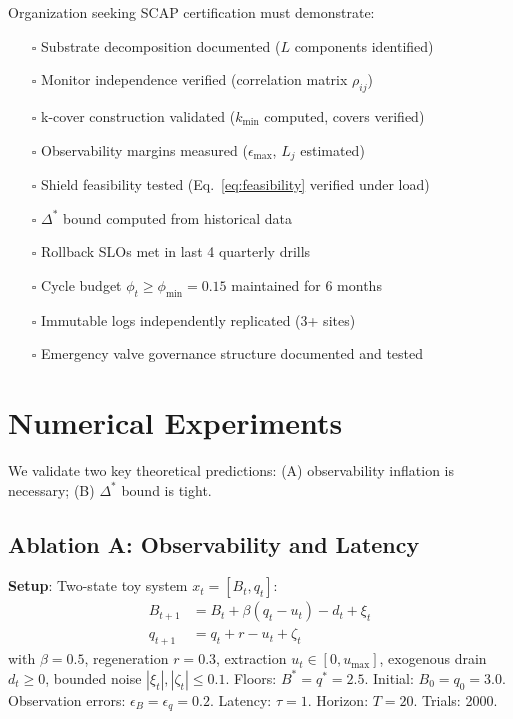 \documentclass[11pt,a4paper]{article}
\begin{document}
Organization seeking SCAP certification must demonstrate:
\begin{itemize}
\item[$\square$] Substrate decomposition documented ($L$ components identified)
\item[$\square$] Monitor independence verified (correlation matrix $\rho_{ij}$)
\item[$\square$] k-cover construction validated ($k_{\min}$ computed, covers verified)
\item[$\square$] Observability margins measured ($\epsilon_{\max}$, $L_j$ estimated)
\item[$\square$] Shield feasibility tested (Eq.~\eqref{eq:feasibility} verified under load)
\item[$\square$] $\Delta^*$ bound computed from historical data
\item[$\square$] Rollback SLOs met in last 4 quarterly drills
\item[$\square$] Cycle budget $\phi_t \geq \phi_{\min} = 0.15$ maintained for 6 months
\item[$\square$] Immutable logs independently replicated (3+ sites)
\item[$\square$] Emergency valve governance structure documented and tested
\end{itemize}

\section{Numerical Experiments}

We validate two key theoretical predictions: (A) observability inflation is necessary; (B) $\Delta^*$ bound is tight.

\subsection{Ablation A: Observability and Latency}

\textbf{Setup}: Two-state toy system $x_t = [B_t, q_t]$:
\begin{align*}
B_{t+1} &= B_t + \beta(q_t - u_t) - d_t + \xi_t \\
q_{t+1} &= q_t + r - u_t + \zeta_t
\end{align*}
with $\beta = 0.5$, regeneration $r = 0.3$, extraction $u_t \in [0, u_{\max}]$, exogenous drain $d_t \geq 0$, bounded noise $|\xi_t|, |\zeta_t| \leq 0.1$. Floors: $B^* = q^* = 2.5$. Initial: $B_0 = q_0 = 3.0$. Observation errors: $\epsilon_B = \epsilon_q = 0.2$. Latency: $\tau = 1$. Horizon: $T=20$. Trials: 2000.
\end{document}
